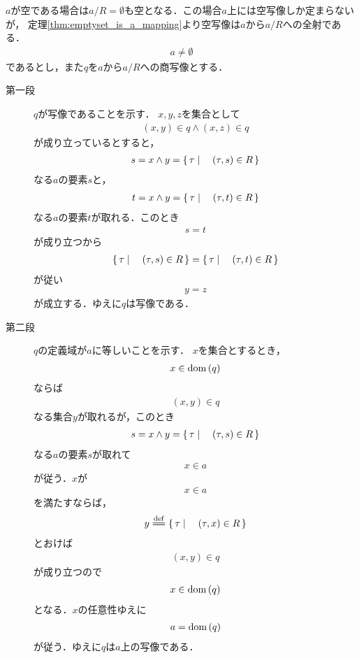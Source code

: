 	\begin{prf}
		$a$が空である場合は$a/R = \emptyset$も空となる．この場合$a$上には空写像しか定まらないが，
		定理\ref{thm:emptyset_is_a_mapping}より空写像は$a$から$a/R$への全射である．
		\begin{align}
			a \neq \emptyset
		\end{align}
		であるとし，また$q$を$a$から$a/R$への商写像とする．
		\begin{description}
		\item[第一段] $q$が写像であることを示す．
		$x,y,z$を集合として
		\begin{align}
			(x,y) \in q \wedge (x,z) \in q
		\end{align}
		が成り立っているとすると，
		\begin{align}
			s = x \wedge y = \left\{\, \tau \mid \quad (\tau,s) \in R\, \right\}
		\end{align}
		なる$a$の要素$s$と，
		\begin{align}
			t = x \wedge y = \left\{\, \tau \mid \quad (\tau,t) \in R\, \right\}
		\end{align}
		なる$a$の要素$t$が取れる．このとき
		\begin{align}
			s = t
		\end{align}
		が成り立つから
		\begin{align}
			\left\{\, \tau \mid \quad (\tau,s) \in R\, \right\} = \left\{\, \tau \mid \quad (\tau,t) \in R\, \right\}
		\end{align}
		が従い
		\begin{align}
			y = z
		\end{align}
		が成立する．ゆえに$q$は写像である．
		
		\item[第二段] $q$の定義域が$a$に等しいことを示す．
		$x$を集合とするとき，
		\begin{align}
			x \in \operatorname*{dom} \left(q\right)
		\end{align}
		ならば
		\begin{align}
			(x,y) \in q
		\end{align}
		なる集合$y$が取れるが，このとき
		\begin{align}
			s = x \wedge y = \left\{\, \tau \mid \quad (\tau,s) \in R\, \right\}
		\end{align}
		なる$a$の要素$s$が取れて
		\begin{align}
			x \in a
		\end{align}
		が従う．$x$が
		\begin{align}
			x \in a
		\end{align}
		を満たすならば，
		\begin{align}
			y \defeq \Set{\tau}{(\tau,x) \in R}
		\end{align}
		とおけば
		\begin{align}
			(x,y) \in q
		\end{align}
		が成り立つので
		\begin{align}
			x \in \operatorname*{dom} \left(q\right)
		\end{align}
		となる．$x$の任意性ゆえに
		\begin{align}
			a = \operatorname*{dom} \left(q\right)
		\end{align}
		が従う．ゆえに$q$は$a$上の写像である．
		

\end{description}
\end{prf}
